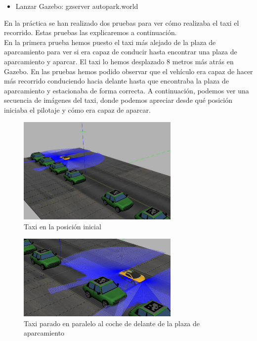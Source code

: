 \begin{itemize}
\item Lanzar Gazebo: gzserver autopark.world
\end{itemize}

En la práctica se han realizado dos pruebas para ver cómo realizaba el taxi el recorrido. Estas pruebas las explicaremos a continuación.\\

En la primera prueba hemos puesto el taxi más alejado de la plaza de aparcamiento para ver si era capaz de conducir hasta encontrar una plaza de aparcamiento y aparcar. El taxi lo hemos desplazado 8 metros más atrás en Gazebo. En las pruebas hemos podido observar que el vehículo era capaz de hacer más recorrido conduciendo hacia delante hasta que encontraba la plaza de aparcamiento y estacionaba de forma correcta. A continuación, podemos ver una secuencia de imágenes del taxi, donde podemos apreciar desde qué posición iniciaba el pilotaje y cómo era capaz de aparcar.

\begin{figure}[H]
  \begin{center}
    \includegraphics[width=0.7\textwidth]{figures/Autopark/Experimento1_1.png}
		\caption{Taxi en la posición inicial}
		\label{fig.Experimento1_1}
		\end{center}
\end{figure}

\begin{figure}[H]
  \begin{center}
    \includegraphics[width=0.7\textwidth]{figures/Autopark/Experimento1_2.png}
		\caption{Taxi parado en paralelo al coche de delante de la plaza de aparcamiento}
		\label{fig.Experimento1_2}
		\end{center}
\end{figure}

